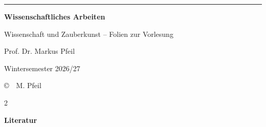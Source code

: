 \documentclass[12pt,a5paper,landscape,openany]{book}
\begin{document}
\pagecolor{\pagecol}

\sffamily\Large
\thispagestyle{empty}
\vspace*{-2mm}
\rwulogo[height=1.6cm]

\vspace*{1.0cm}
{\color{rwuviolet}\rule{\textwidth}{0.7mm}}

\vspace*{5mm}
{\fontsize{28}{34}\selectfont\bfseries\color{rwuviolet} Wissenschaftliches Arbeiten}

\vspace*{2mm}
{\Large\color{rwucyandark} Wissenschaft und Zauberkunst -- Folien zur Vorlesung}

\vspace*{6mm}
{\large Prof. Dr. Markus Pfeil}

\vspace*{3mm}
{\large Wintersemester 2026/27}

\vfill
{\scriptsize\color{rwugray} \copyright~~M. Pfeil}
\newpage

\begin{multicols}{2}\normalsize \parskip -2mm
\tableofcontents
\end{multicols}

\renewcommand{\chapter}[1]{\refstepcounter{chapter}\newpage
       \textcolor{headcol}{\begin{center}\Huge\bfseries
      \thechapter~ #1\end{center}}\addcontentsline{toc}{chapter}{#1}
}



\newpage
\textcolor{headcol}{\begin{center}\Huge\bfseries Literatur\end{center}}
\printbibliography[heading=none]
\end{document}
